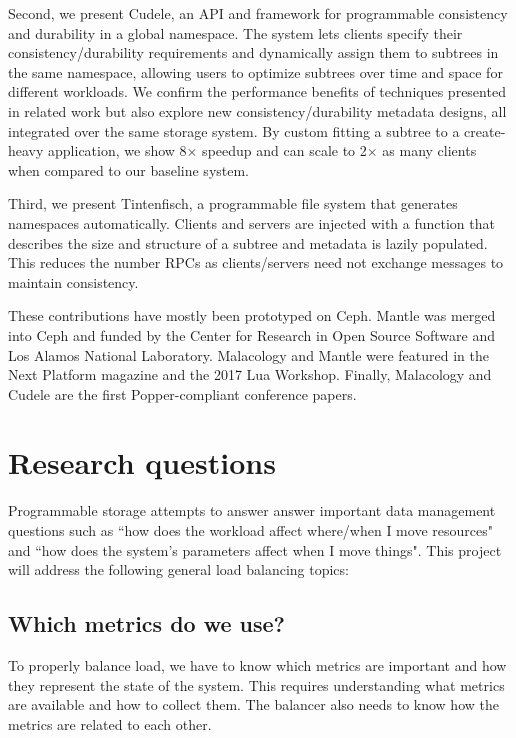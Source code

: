 Second, we present Cudele, an API and framework for programmable consistency
and durability in a global namespace. The system lets clients specify their
consistency/durability requirements and dynamically assign them to subtrees in
the same namespace, allowing users to optimize subtrees over time and space for
different workloads. We confirm the performance benefits of techniques
presented in related work but also explore new consistency/durability metadata
designs, all integrated over the same storage system. By custom fitting a
subtree to a create- heavy application, we show 8× speedup and can scale to
2\(\times\) as many clients when compared to our baseline system.

Third, we present Tintenfisch, a programmable file system that generates
namespaces automatically. Clients and servers are injected with a function that
describes the size and structure of a subtree and metadata is lazily populated.
This reduces the number RPCs as clients/servers need not exchange messages to
maintain consistency.

These contributions have mostly been prototyped on Ceph. Mantle was merged into
Ceph and funded by the Center for Research in Open Source Software and Los
Alamos National Laboratory. Malacology and Mantle were featured in the Next
Platform magazine and the 2017 Lua Workshop. Finally, Malacology and Cudele are
the first Popper-compliant conference papers.

\section{Research questions}

Programmable storage attempts to answer answer important data management
questions such as ``how does the workload affect where/when I move resources"
and ``how does the system's parameters affect when I move things". This project
will address the following general load balancing topics:

\subsection*{Which metrics do we use?}

To properly balance load, we have to know which metrics are important and how
they represent the state of the system. This requires understanding what
metrics are available and how to collect them. The balancer also needs to know
how the metrics are related to each other.

